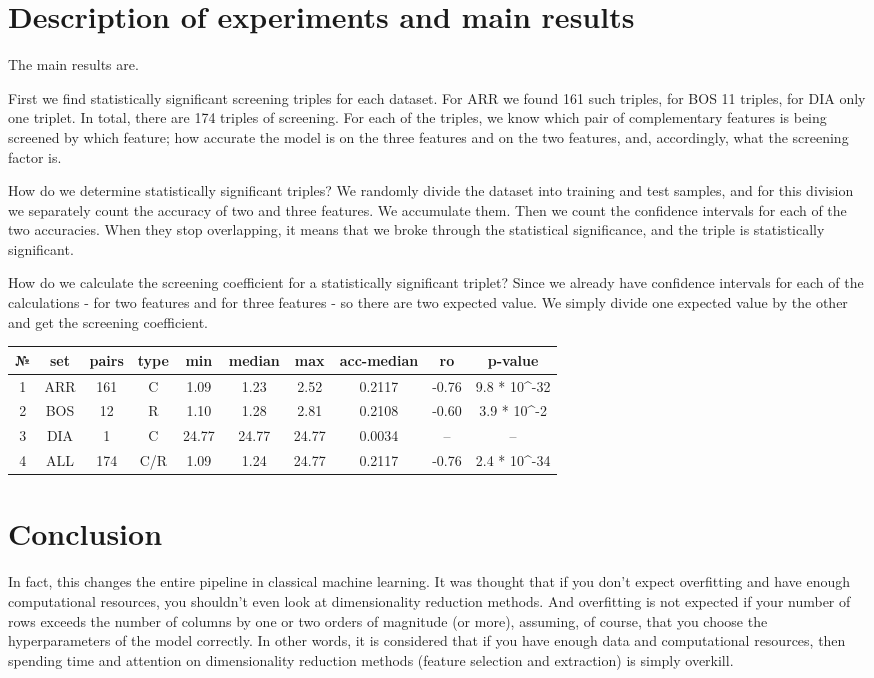 \documentclass[12pt]{a&t}
\begin{document}
\section{Description of experiments and main results}
The main results are.

First we find statistically significant screening triples for each dataset. For ARR we found 161 such triples, for BOS 11 triples, for DIA only one triplet. In total, there are 174 triples of screening. For each of the triples, we know which pair of complementary features is being screened by which feature; how accurate the model is on the three features and on the two features, and, accordingly, what the screening factor is.

How do we determine statistically significant triples? We randomly divide the dataset into training and test samples, and for this division we separately count the accuracy of two and three features. We accumulate them. Then we count the confidence intervals for each of the two accuracies. When they stop overlapping, it means that we broke through the statistical significance, and the triple is statistically significant. 

How do we calculate the screening coefficient for a statistically significant triplet? Since we already have confidence intervals for each of the calculations - for two features and for three features - so there are two expected value. We simply divide one expected value by the other and get the screening coefficient. 

\begin{center}
\begin{tabular}{ |c||c|c|c|c|c|c|c|c|c| } 
  \hline
  № & set & pairs & type & min & median & max & acc-median & ro & p-value \\
 \hline
 \hline
 1 & ARR & 161 & C & 1.09 & 1.23 & 2.52 & 0.2117 & -0.76 & 9.8 * 10^{-32} \\ 
 2 & BOS & 12 & R & 1.10 & 1.28 & 2.81 & 0.2108 & -0.60 & 3.9 * 10^{-2} \\ 
 3 & DIA & 1 & C& 24.77 & 24.77 & 24.77 & 0.0034 & -- & --\\ 
 4 & ALL & 174 & C/R & 1.09 & 1.24 & 24.77 & 0.2117 & -0.76 & 2.4 * 10^{-34} \\ 
 \hline
\end{tabular}
\end{center}

\section{Conclusion}
In fact, this changes the entire pipeline in classical machine learning. It was thought that if you don't expect overfitting and have enough computational resources, you shouldn't even look at dimensionality reduction methods. And overfitting is not expected if your number of rows exceeds the number of columns by one or two orders of magnitude (or more), assuming, of course, that you choose the hyperparameters of the model correctly. In other words, it is considered that if you have enough data and computational resources, then spending time and attention on dimensionality reduction methods (feature selection and extraction) is simply overkill. 
\end{document}
